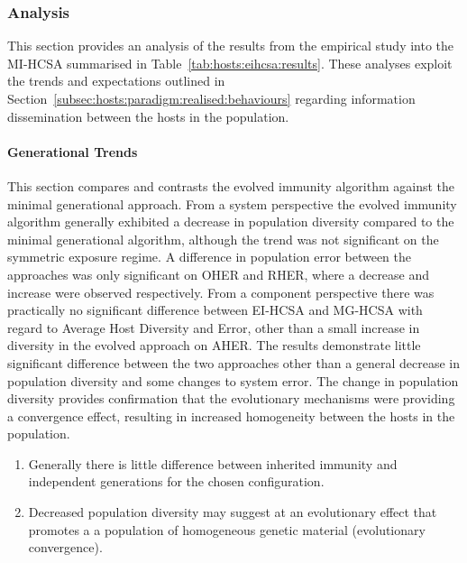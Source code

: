 %
%
\subsubsection{Analysis}
This section provides an analysis of the results from the empirical study into the MI-HCSA summarised in Table~\ref{tab:hosts:eihcsa:results}. These analyses exploit the trends and expectations outlined in Section~\ref{subsec:hosts:paradigm:realised:behaviours} regarding information dissemination between the hosts in the population.

%
%
\paragraph{Generational Trends}
This section compares and contrasts the evolved immunity algorithm against the minimal generational approach. 
From a system perspective the evolved immunity algorithm generally exhibited a decrease in population diversity compared to the minimal generational algorithm, although the trend was not significant on the symmetric exposure regime. A difference in population error between the approaches was only significant on OHER and RHER, where a decrease and increase were observed respectively. 
From a component perspective there was practically no significant difference between EI-HCSA and MG-HCSA with regard to Average Host Diversity and Error, other than a small increase in diversity in the evolved approach on AHER.
The results demonstrate little significant difference between the two approaches other than a general decrease in population diversity and some changes to system error. The change in population diversity provides confirmation that the evolutionary mechanisms were providing a convergence effect, resulting in increased homogeneity between the hosts in the population. 

\begin{enumerate}
	\item Generally there is little difference between inherited immunity and independent generations for the chosen configuration.
	\item Decreased population diversity may suggest at an evolutionary effect that promotes a a population of homogeneous genetic material (evolutionary convergence). 
\end{enumerate}

%
%
